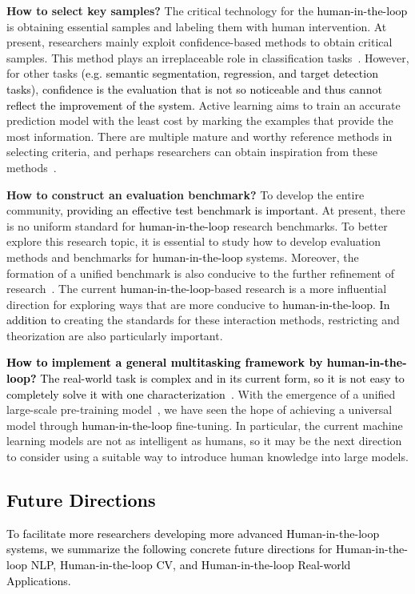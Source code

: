 \documentclass{article}
\newcommand{\p}[1]{\textcolor{black}{#1}}
\newcommand{\REO}[1]{\textcolor{black}{#1}}
\newcommand{\ZJH}[1]{\textcolor{black}{#1}}
\begin{document}
\noindent
\textbf{How to select key samples? }
The critical technology for the \REO{human-in-the-loop} is obtaining essential samples and labeling them with human intervention. At present, researchers mainly exploit confidence-based methods to obtain critical samples. This method plays an irreplaceable role in classification tasks~\cite{wan2020human,yang2020optimal}.
However, for other tasks \ZJH{(e.g. semantic segmentation, regression, and target detection tasks)}, \p{confidence is the evaluation that is not so noticeable and thus cannot reflect the improvement of the system.}
Active learning aims to train an accurate prediction model with the least cost by marking the examples that provide the most information. There are multiple mature and worthy reference methods in selecting criteria, and perhaps researchers can obtain inspiration from these methods~\cite{fu2013survey}.




\noindent
\textbf{How to construct an evaluation benchmark? }
To develop the entire community, \ZJH{providing an effective test benchmark is important.} At present, there is no uniform standard for \REO{human-in-the-loop} research benchmarks. To better explore this research topic, it is essential to study how to develop evaluation methods and benchmarks for \REO{human-in-the-loop} systems. Moreover, the formation of a unified benchmark is also conducive to the further refinement of research~\cite{chai2020human}. The current \REO{human-in-the-loop}-based research is a more influential direction for exploring ways that are more conducive to \REO{human-in-the-loop}. \ZJH{In addition to} creating the standards for these interaction methods, restricting and theorization are also particularly important.



\noindent
\REO{
\textbf{How to implement a general multitasking framework by \REO{human-in-the-loop}? }}
\ZJH{The real-world task is complex and in its current form, so it is not easy to completely solve it with one characterization~\cite{zhang2017human}.}
With the emergence of a unified large-scale pre-training model~\cite{tay2020efficient,khan2021transformers}, we have seen the hope of achieving a universal model through \REO{human-in-the-loop} fine-tuning. In particular, the current machine learning models are not as intelligent as humans, so it may be the next direction to consider using a suitable way to introduce human knowledge into large models.

\REO{\subsection{Future Directions}}
\REO{To facilitate more researchers developing more advanced Human-in-the-loop systems, we summarize the following concrete future directions for Human-in-the-loop NLP, Human-in-the-loop  CV, and  Human-in-the-loop  Real-world Applications.}
\end{document}

